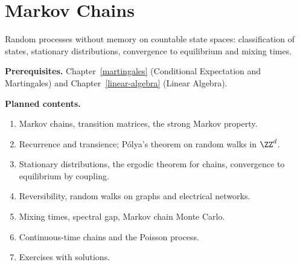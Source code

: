 \chapter{Markov Chains}\label{markov-chains}

Random processes without memory on countable state spaces: classification of states, stationary
distributions, convergence to equilibrium and mixing times.

\noindent\textbf{Prerequisites.} Chapter~\ref{martingales} (Conditional Expectation and Martingales) and Chapter~\ref{linear-algebra} (Linear Algebra).

\noindent\textbf{Planned contents.}
\begin{enumerate}
\item Markov chains, transition matrices, the strong Markov property.
\item Recurrence and transience; P\'olya's theorem on random walks in $\ZZ^d$.
\item Stationary distributions, the ergodic theorem for chains, convergence to equilibrium by coupling.
\item Reversibility, random walks on graphs and electrical networks.
\item Mixing times, spectral gap, Markov chain Monte Carlo.
\item Continuous-time chains and the Poisson process.
\item Exercises with solutions.
\end{enumerate}
